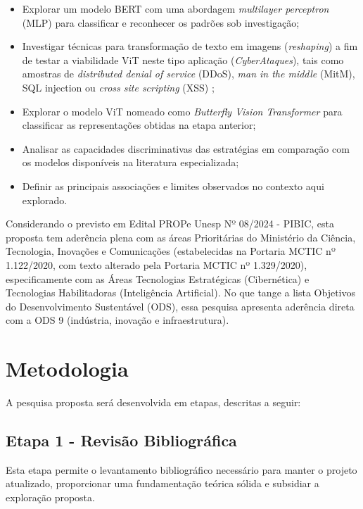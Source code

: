 \begin{itemize}
    \item 
    Explorar um modelo BERT com uma abordagem \textit{multilayer perceptron} (MLP) para classificar e reconhecer os padrões sob investigação;
    \item 
    Investigar técnicas para transformação de texto em imagens (\textit{reshaping}) a fim de testar a viabilidade ViT neste tipo aplicação (\textit{CyberAtaques}), tais como amostras de \textit{distributed denial of service} (DDoS), \textit{man in the middle} (MitM), SQL injection ou \textit{cross site scripting} (XSS) \cite{luxemburk2021detection};
    \item 
    Explorar o modelo ViT nomeado como \textit{Butterfly Vision Transformer} para classificar as representações obtidas na etapa anterior;
    \item
    Analisar as capacidades discriminativas das estratégias em comparação com os modelos disponíveis na literatura especializada;
    \item Definir as principais associações e limites observados no contexto aqui explorado.
    
\end{itemize}

Considerando o previsto em Edital PROPe Unesp Nº 08/2024 - PIBIC, esta proposta tem aderência plena com as áreas Prioritárias do Ministério da Ciência, Tecnologia, Inovações e Comunicações (estabelecidas na Portaria MCTIC nº 1.122/2020, com texto alterado pela Portaria MCTIC nº 1.329/2020), especificamente com as Áreas Tecnologias Estratégicas (Cibernética) e Tecnologias Habilitadoras (Inteligência Artificial). No que tange a lista Objetivos do Desenvolvimento Sustentável (ODS), essa pesquisa apresenta aderência direta com a ODS 9 (indústria, inovação e infraestrutura).

\section{Metodologia}

A pesquisa proposta será desenvolvida em etapas, descritas a seguir:

\subsection{Etapa 1 - Revisão Bibliográfica}

Esta etapa permite o levantamento bibliográfico necessário para manter o projeto atualizado, proporcionar uma fundamentação teórica sólida e subsidiar a exploração proposta.

